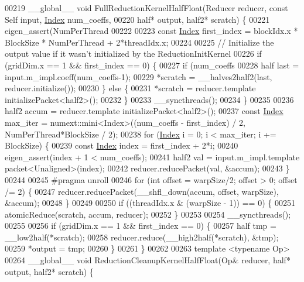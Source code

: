 \begin{DoxyCode}
00219 \_\_global\_\_ \textcolor{keywordtype}{void} FullReductionKernelHalfFloat(Reducer reducer, \textcolor{keyword}{const} Self input, 
      \hyperlink{namespace_eigen_a62e77e0933482dafde8fe197d9a2cfde}{Index} num\_coeffs,
00220                                     half* output, half2* scratch) \{
00221   eigen\_assert(NumPerThread %
00222 
00223   \textcolor{keyword}{const} \hyperlink{namespace_eigen_a62e77e0933482dafde8fe197d9a2cfde}{Index} first\_index = blockIdx.x * BlockSize * NumPerThread + 2*threadIdx.x;
00224 
00225   \textcolor{comment}{// Initialize the output value if it wasn't initialized by the ReductionInitKernel}
00226   \textcolor{keywordflow}{if} (gridDim.x == 1 && first\_index == 0) \{
00227     \textcolor{keywordflow}{if} (num\_coeffs %
00228       half last = input.m\_impl.coeff(num\_coeffs-1);
00229       *scratch = \_\_halves2half2(last, reducer.initialize());
00230     \} \textcolor{keywordflow}{else} \{
00231       *scratch = reducer.template initializePacket<half2>();
00232     \}
00233     \_\_syncthreads();
00234   \}
00235 
00236   half2 accum = reducer.template initializePacket<half2>();
00237   \textcolor{keyword}{const} \hyperlink{namespace_eigen_a62e77e0933482dafde8fe197d9a2cfde}{Index} max\_iter = numext::mini<Index>((num\_coeffs - first\_index) / 2, NumPerThread*BlockSize / 
      2);
00238   \textcolor{keywordflow}{for} (\hyperlink{namespace_eigen_a62e77e0933482dafde8fe197d9a2cfde}{Index} i = 0; i < max\_iter; i += BlockSize) \{
00239     \textcolor{keyword}{const} \hyperlink{namespace_eigen_a62e77e0933482dafde8fe197d9a2cfde}{Index} index = first\_index + 2*i;
00240     eigen\_assert(index + 1 < num\_coeffs);
00241     half2 val = input.m\_impl.template packet<Unaligned>(index);
00242     reducer.reducePacket(val, &accum);
00243   \}
00244 
00245 \textcolor{preprocessor}{#pragma unroll}
00246   \textcolor{keywordflow}{for} (\textcolor{keywordtype}{int} offset = warpSize/2; offset > 0; offset /= 2) \{
00247     reducer.reducePacket(\_\_shfl\_down(accum, offset, warpSize), &accum);
00248   \}
00249 
00250   \textcolor{keywordflow}{if} ((threadIdx.x & (warpSize - 1)) == 0) \{
00251     atomicReduce(scratch, accum, reducer);
00252   \}
00253 
00254   \_\_syncthreads();
00255 
00256   \textcolor{keywordflow}{if} (gridDim.x == 1 && first\_index == 0) \{
00257     half tmp = \_\_low2half(*scratch);
00258     reducer.reduce(\_\_high2half(*scratch), &tmp);
00259     *output = tmp;
00260   \}
00261 \}
00262 
00263 \textcolor{keyword}{template} <\textcolor{keyword}{typename} Op>
00264 \_\_global\_\_ \textcolor{keywordtype}{void} ReductionCleanupKernelHalfFloat(Op& reducer, half* output, half2* scratch) \{

\end{DoxyCode}
